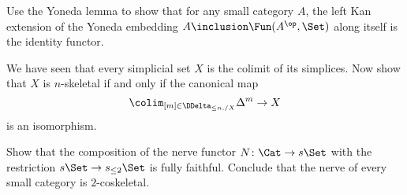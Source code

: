 











\begin{exercises}
  \item%
    \label{exercise:stronggeneration}
    Use the Yoneda lemma to show that for any small category $A$,
    the left Kan extension of the Yoneda embedding $A \inclusion \Fun(A^{\op}, \Set)$ along itself is the identity functor.
  \item%
    \label{exercise:nskeletonascolimit}
    We have seen that every simplicial set $X$ is the colimit of its simplices.
    Now show that $X$ is $n$-skeletal if and only if the canonical map
    \[
      \colim_{[m] \in \DDelta_{\leq n, /X}} \Delta^m \to X
    \]
    is an isomorphism.
  \item%
    \label{exercise:nerve2cosk}
    Show that the composition of the nerve functor $N \colon \Cat \to s\Set$ with the restriction $s\Set \to s_{\leq 2}\Set$ is fully faithful.
    Conclude that the nerve of every small category is $2$-coskeletal.
\end{exercises}



